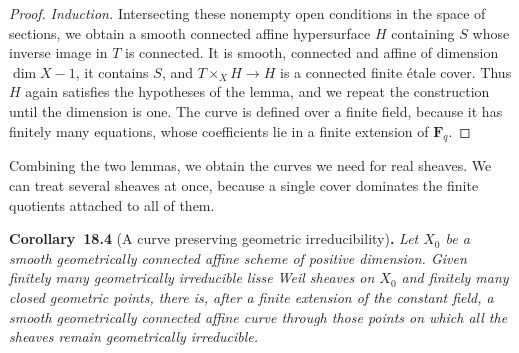 \documentclass[11pt]{article}
\newenvironment{bpstatement}[2]{\par\addvspace{0.6\baselineskip}\noindent\textbf{#1}#2\textbf{.}\enspace\ignorespaces}
  {\par\addvspace{0.4\baselineskip}}
\newenvironment{bpstatementit}[2]{\begin{bpstatement}{#1}{#2}\itshape\ignorespaces}{\end{bpstatement}}
\begin{document}
\begin{proof}[{Proof}]
\emph{Induction.} Intersecting these nonempty open conditions in the space of sections, we obtain a smooth connected affine hypersurface \(H\) containing \(S\) whose inverse image in \(T\) is connected. It is smooth, connected and affine of dimension \(\dim X-1\), it contains \(S\), and \(T\times_XH\to H\) is a connected finite étale cover. Thus \(H\) again satisfies the hypotheses of the lemma, and we repeat the construction until the dimension is one. The curve is defined over a finite field, because it has finitely many equations, whose coefficients lie in a finite extension of \(\mathbf F_q\).
\end{proof}

\label{bp283}%
Combining the two lemmas, we obtain the curves we need for real sheaves. We can treat several sheaves at once, because a single cover dominates the finite quotients attached to all of them.

\label{bp284}%
\begin{bpstatementit}{Corollary~18.4}{ (A curve preserving geometric irreducibility)}
Let \(X_0\) be a smooth geometrically connected affine scheme of positive dimension. Given finitely many geometrically irreducible lisse Weil sheaves on \(X_0\) and finitely many closed geometric points, there is, after a finite extension of the constant field, a smooth geometrically connected affine curve through those points on which all the sheaves remain geometrically irreducible.
\end{bpstatementit}
\end{document}
